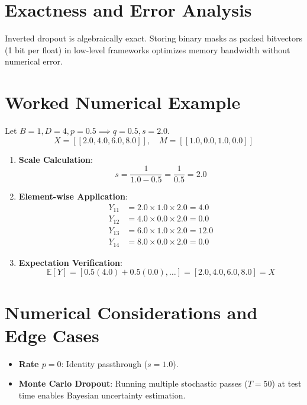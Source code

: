 \documentclass[11pt,a4paper]{article}
\theoremstyle{definition}
\begin{document}
\section{Exactness and Error Analysis}

Inverted dropout is algebraically exact. Storing binary masks as packed bitvectors (1 bit per float) in low-level frameworks optimizes memory bandwidth without numerical error.

\section{Worked Numerical Example}

Let $B = 1, D = 4, p = 0.5 \implies q = 0.5, s = 2.0$.
\begin{equation}
X = [[2.0, 4.0, 6.0, 8.0]], \quad M = [[1.0, 0.0, 1.0, 0.0]]
\end{equation}

\begin{enumerate}
    \item \textbf{Scale Calculation}:
    \begin{equation}
    s = \frac{1}{1.0 - 0.5} = \frac{1}{0.5} = 2.0
    \end{equation}
    \item \textbf{Element-wise Application}:
    \begin{align}
    Y_{11} &= 2.0 \times 1.0 \times 2.0 = 4.0 \\
    Y_{12} &= 4.0 \times 0.0 \times 2.0 = 0.0 \\
    Y_{13} &= 6.0 \times 1.0 \times 2.0 = 12.0 \\
    Y_{14} &= 8.0 \times 0.0 \times 2.0 = 0.0
    \end{align}
    \item \textbf{Expectation Verification}:
    \begin{equation}
    \mathbb{E}[Y] = [0.5(4.0) + 0.5(0.0), \dots] = [2.0, 4.0, 6.0, 8.0] = X
    \end{equation}
\end{enumerate}

\section{Numerical Considerations and Edge Cases}

\begin{itemize}
    \item \textbf{Rate $p = 0$}: Identity passthrough ($s = 1.0$).
    \item \textbf{Monte Carlo Dropout}: Running multiple stochastic passes ($T = 50$) at test time enables Bayesian uncertainty estimation.
\end{itemize}
\end{document}

